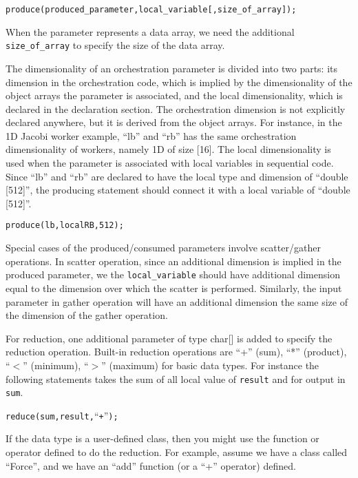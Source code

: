 \documentclass[10pt]{article}
\def\code#1{{\small {\tt {#1}}}}
\begin{document}
\begin{alltt}
    produce(produced\_parameter, local\_variable[, size\_of\_array]);
\end{alltt}

When the parameter represents a data array, we need the additional
\code{size\_of\_array} to specify the size of the data array. 

The dimensionality of an orchestration parameter is divided into two parts: 
its dimension in the orchestration code, which is implied by the dimensionality
of the object arrays the parameter is associated, and the local dimensionality,
which is declared in the declaration section. The orchestration dimension is not
explicitly declared anywhere, but it is derived from the object arrays. For 
instance, in the 1D Jacobi worker example, ``lb'' and ``rb'' has the same 
orchestration dimensionality of workers, namely 1D of size [16]. The local
dimensionality is used when the parameter is associated with local variables 
in sequential code. Since ``lb'' and ``rb'' are declared to have the local
type and dimension of ``double [512]'', the producing statement should connect
it with a local variable of ``double [512]''.

\begin{alltt}
    produce(lb,localRB,512);
\end{alltt}

Special cases of the produced/consumed parameters involve scatter/gather
operations. In scatter operation, since an additional dimension is implied in
the produced parameter, we the \code{local\_variable} should have additional
dimension equal to the dimension over which the scatter is performed. Similarly,
the input parameter in gather operation will have an additional dimension the
same size of the dimension of the gather operation.

For reduction, one additional parameter of type char[] is added to specify the
reduction operation. Built-in reduction operations are ``+'' (sum), ``*'' (product),
``$<$'' (minimum), ``$>$'' (maximum) for basic data types. For instance the 
following statements takes the sum of all local value of \code{result} and 
for output in \code{sum}.

\begin{alltt}
    reduce(sum, result, ``+'');
\end{alltt}

If the data type is a user-defined class, then you might use the function or
operator defined to do the reduction. For example, assume we have a class
called ``Force'', and we have an ``add'' function (or a ``+'' operator) defined.
\end{document}
